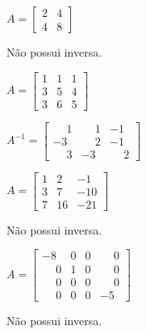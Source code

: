 \documentclass[12pt]{exam}
\begin{document}
\begin{exercicio}
  $
    A =\begin{bmatrix}
        2 & 4\\
        4 & 8
    \end{bmatrix}
  $
  \begin{solucao}
    N\~ao possui inversa.
  \end{solucao}
\end{exercicio}

\begin{exercicio}
  $
    A =\begin{bmatrix}
        1 & 1 & 1\\
        3 & 5 & 4\\
        3 & 6 & 5
      \end{bmatrix}
    $
  \begin{solucao}
    $
      A^{-1} =\begin{bmatrix}
        \phantom{-} 1 & \phantom{-} 1 & -1\\
        -3 & \phantom{-} 2 & -1\\
        \phantom{-} 3 & -3 & \phantom{-} 2
      \end{bmatrix}
    $
  \end{solucao}
\end{exercicio}

\begin{exercicio}
  $
    A =\begin{bmatrix}
        1 & 2 & -1\\
        3 & 7 & -10\\
        7 & 16 & -21
    \end{bmatrix}
  $
  \begin{solucao}
    N\~ao possui inversa.
  \end{solucao}
\end{exercicio}

\begin{exercicio}
  $
    A =\begin{bmatrix}
        -8 & 0 & 0 & \phantom{-} 0\\
        \phantom{-} 0 & 1 & 0 & \phantom{-} 0\\
        \phantom{-} 0 & 0 & 0 & \phantom{-} 0\\
        \phantom{-} 0 & 0 & 0 & -5
    \end{bmatrix}
  $
  \begin{solucao}
   N\~ao possui inversa.
  \end{solucao}
\end{exercicio}
\end{document}
